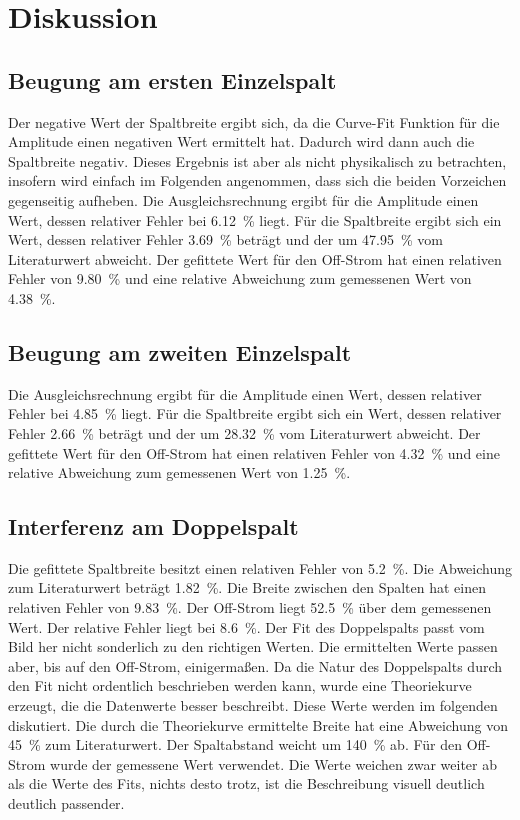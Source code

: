 \section{Diskussion}
\label{sec:Diskussion}


\subsection{Beugung am ersten Einzelspalt}
Der negative Wert der Spaltbreite ergibt sich, da die Curve-Fit Funktion für die Amplitude einen negativen Wert ermittelt hat. Dadurch wird dann auch die Spaltbreite negativ. Dieses Ergebnis ist aber als nicht physikalisch zu betrachten, insofern wird einfach im Folgenden angenommen, dass sich die beiden Vorzeichen gegenseitig aufheben. 
Die Ausgleichsrechnung ergibt für die Amplitude einen Wert, dessen relativer Fehler bei \SI{6.12}{\percent} liegt. Für die Spaltbreite ergibt sich ein Wert, dessen relativer Fehler \SI{3.69}{\percent} beträgt und der um \SI{47.95}{\percent} vom Literaturwert abweicht.
Der gefittete Wert für den Off-Strom hat einen relativen Fehler von \SI{9.80}{\percent} und eine relative Abweichung zum gemessenen Wert von \SI{4.38}{\percent}.


\subsection{Beugung am zweiten Einzelspalt}
Die Ausgleichsrechnung ergibt für die Amplitude einen Wert, dessen relativer Fehler bei \SI{4.85}{\percent} liegt. Für die Spaltbreite ergibt sich ein Wert, dessen relativer Fehler \SI{2.66}{\percent} beträgt und der um \SI{28.32}{\percent} vom Literaturwert abweicht.
Der gefittete Wert für den Off-Strom hat einen relativen Fehler von \SI{4.32}{\percent} und eine relative Abweichung zum gemessenen Wert von \SI{1.25}{\percent}.

\subsection{Interferenz am Doppelspalt}
Die gefittete Spaltbreite besitzt einen relativen Fehler von \SI{5.2}{\percent}. Die Abweichung zum Literaturwert beträgt \SI{1.82}{\percent}.  
Die Breite zwischen den Spalten hat einen relativen Fehler von \SI{9.83}{\percent}. Der Off-Strom liegt \SI{52.5}{\percent} über dem gemessenen Wert. Der relative Fehler liegt bei \SI{8.6}{\percent}. Der Fit des Doppelspalts passt vom Bild her nicht sonderlich zu den richtigen Werten. Die ermittelten Werte passen aber, bis auf den Off-Strom, einigermaßen.
\newline
Da die Natur des Doppelspalts durch den Fit nicht ordentlich beschrieben werden kann, wurde eine Theoriekurve erzeugt, die die Datenwerte besser beschreibt. 
Diese Werte werden im folgenden diskutiert.
Die durch die Theoriekurve ermittelte Breite hat eine Abweichung von \SI{45}{\percent} zum Literaturwert.
Der Spaltabstand weicht um \SI{140}{\percent} ab. Für den Off-Strom wurde der gemessene Wert verwendet. Die Werte weichen zwar weiter ab als die Werte des Fits, nichts desto trotz, ist die Beschreibung visuell deutlich deutlich passender.  

